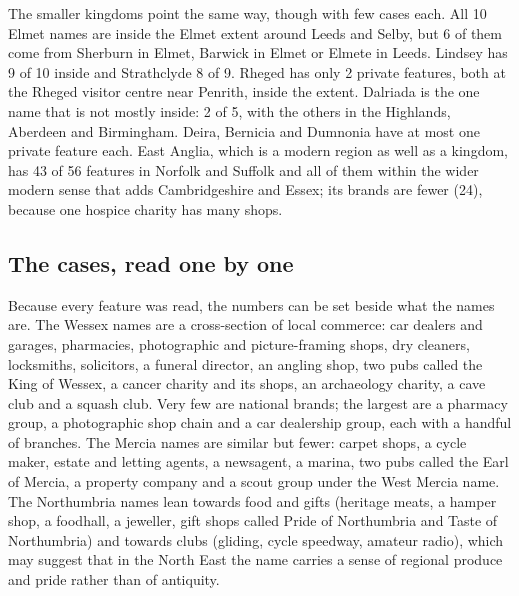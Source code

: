 \documentclass[11pt,a4paper]{article}
\begin{document}
The smaller kingdoms point the same way, though with few cases each. All 10 Elmet names are inside the Elmet extent around Leeds and Selby, but 6 of them come from Sherburn in Elmet, Barwick in Elmet or Elmete in Leeds. Lindsey has 9 of 10 inside and Strathclyde 8 of 9. Rheged has only 2 private features, both at the Rheged visitor centre near Penrith, inside the extent. Dalriada is the one name that is not mostly inside: 2 of 5, with the others in the Highlands, Aberdeen and Birmingham. Deira, Bernicia and Dumnonia have at most one private feature each. East Anglia, which is a modern region as well as a kingdom, has 43 of 56 features in Norfolk and Suffolk and all of them within the wider modern sense that adds Cambridgeshire and Essex; its brands are fewer (24), because one hospice charity has many shops.


\subsection{The cases, read one by one}
Because every feature was read, the numbers can be set beside what the names are. The Wessex names are a cross-section of local commerce: car dealers and garages, pharmacies, photographic and picture-framing shops, dry cleaners, locksmiths, solicitors, a funeral director, an angling shop, two pubs called the King of Wessex, a cancer charity and its shops, an archaeology charity, a cave club and a squash club. Very few are national brands; the largest are a pharmacy group, a photographic shop chain and a car dealership group, each with a handful of branches. The Mercia names are similar but fewer: carpet shops, a cycle maker, estate and letting agents, a newsagent, a marina, two pubs called the Earl of Mercia, a property company and a scout group under the West Mercia name. The Northumbria names lean towards food and gifts (heritage meats, a hamper shop, a foodhall, a jeweller, gift shops called Pride of Northumbria and Taste of Northumbria) and towards clubs (gliding, cycle speedway, amateur radio), which may suggest that in the North East the name carries a sense of regional produce and pride rather than of antiquity.
\end{document}
